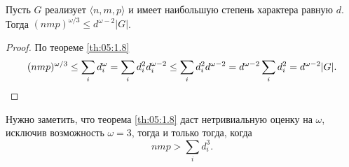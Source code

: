 \begin{corollary}\label{cor:05:1.9}
  Пусть $G$ реализует $\langle n,m,p \rangle$ и имеет наибольшую степень характера равную $d$. Тогда $(nmp)^{\omega / 3} \leq d ^{\omega-2} |G|$.
\end{corollary}
\begin{proof}
По теореме \ref{th:05:1.8}
\[
	(nmp)^{\omega/3} \leq \sum\limits_i d_i^\omega = \sum\limits_i d_i^2 d_i^{\omega - 2} \leq \sum\limits_i d_i^2 d^{\omega - 2} = d^{\omega - 2} \sum\limits_i d_i^2 = d^{\omega - 2}|G|. \qedhere
\]
\end{proof}

Нужно заметить, что теорема \ref{th:05:1.8} даст нетривиальную оценку на $\omega$, исключив возможность $\omega=3$, тогда и только тогда, когда 
\[
	nmp > \sum\limits_i d_i^3.
\]






